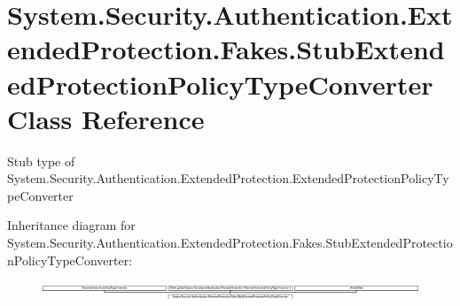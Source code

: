 \hypertarget{class_system_1_1_security_1_1_authentication_1_1_extended_protection_1_1_fakes_1_1_stub_extendedf67afed15bbc0df07bfc91316f6f81f0}{\section{System.\-Security.\-Authentication.\-Extended\-Protection.\-Fakes.\-Stub\-Extended\-Protection\-Policy\-Type\-Converter Class Reference}
\label{class_system_1_1_security_1_1_authentication_1_1_extended_protection_1_1_fakes_1_1_stub_extendedf67afed15bbc0df07bfc91316f6f81f0}
}


Stub type of System.\-Security.\-Authentication.\-Extended\-Protection.\-Extended\-Protection\-Policy\-Type\-Converter 


Inheritance diagram for System.\-Security.\-Authentication.\-Extended\-Protection.\-Fakes.\-Stub\-Extended\-Protection\-Policy\-Type\-Converter\-:\begin{figure}[H]
\begin{center}
\leavevmode
\includegraphics[height=0.591653cm]{class_system_1_1_security_1_1_authentication_1_1_extended_protection_1_1_fakes_1_1_stub_extendedf67afed15bbc0df07bfc91316f6f81f0}
\end{center}
\end{figure}
